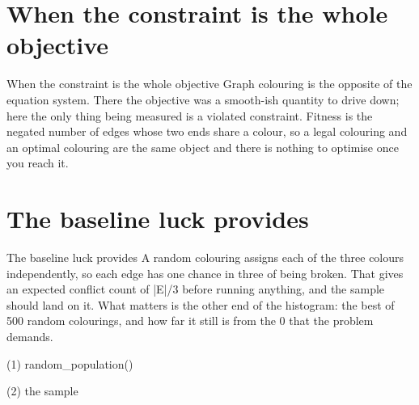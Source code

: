 \section{When the constraint is the whole objective}

\begin{frame}{When the constraint is the whole objective}
Graph colouring is the opposite of the equation system. There the objective was
a smooth-ish quantity to drive down; here the only thing being measured is a
violated constraint. Fitness is the negated number of edges whose two ends share
a colour, so a legal colouring and an optimal colouring are the same object and
there is nothing to optimise once you reach it.
\end{frame}


\section{The baseline luck provides}

\begin{frame}{The baseline luck provides}
A random colouring assigns each of the three colours independently, so each edge
has one chance in three of being broken. That gives an expected conflict count
of |E|/3 before running anything, and the sample should land on it. What matters
is the other end of the histogram: the best of 500 random colourings, and how
far it still is from the 0 that the problem demands.
\end{frame}

\begin{frame}[fragile]{(1) random\_population()}

\end{frame}

\begin{frame}[fragile]{(2) the sample}

\end{frame}


